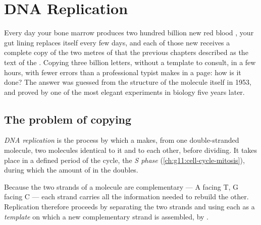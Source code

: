 \chapter{DNA Replication}\label{ch:g11:dna-replication}

Every day your bone marrow produces two hundred billion new red blood
, your gut lining replaces itself every few days, and each of those
new  receives a complete copy of the two metres of  that the
previous chapters described as the text of the . Copying
three billion letters, without a template to consult, in a few hours,
with fewer errors than a professional typist makes in a page: how is it
done? The answer was guessed from the structure of the molecule itself
in 1953, and proved by one of the most elegant experiments in biology
five years later.

\section{The problem of copying}

\begin{definition}[Replication]\label{def:g11:dna-replication:replication}
\emph{DNA replication} is the process by which a
 makes, from one double-stranded  molecule, two molecules
identical to it and to each other, before dividing. It takes place in
a defined period of the  cycle, the \emph{S phase}
(\cref{ch:g11:cell-cycle-mitosis}), during which the amount of  in
the  doubles.
\end{definition}

\begin{proposition}\label{prop:g11:dna-replication:template}
Because the two strands of a  molecule are complementary --- A
facing T, G facing C --- each strand carries all the information needed
to rebuild the other. Replication therefore proceeds by separating the
two strands and using each as a \emph{template} on which a new
complementary strand is assembled,  by .
\end{proposition}
\admitted

